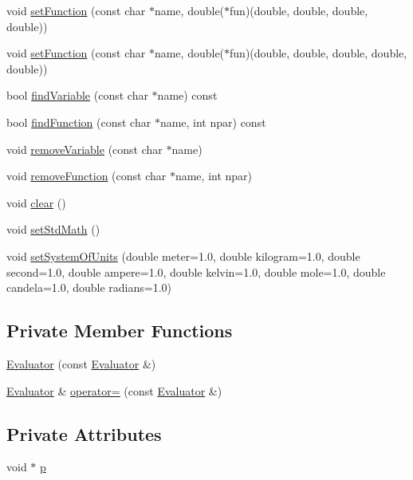 \begin{DoxyCompactItemize}
\item 
void \hyperlink{class_xml_tools_1_1_evaluator_a7e77831c7bca5fd7bb81d31b657844d1}{setFunction} (const char $\ast$name, double($\ast$fun)(double, double, double, double))
\item 
void \hyperlink{class_xml_tools_1_1_evaluator_ad4808f32cfac966a6ee400acaf7ff3ca}{setFunction} (const char $\ast$name, double($\ast$fun)(double, double, double, double, double))
\item 
bool \hyperlink{class_xml_tools_1_1_evaluator_afc296d1cfdcdb65b93e40b30cf2c2704}{findVariable} (const char $\ast$name) const 
\item 
bool \hyperlink{class_xml_tools_1_1_evaluator_ab2b36613d2c977346178abbd062ee354}{findFunction} (const char $\ast$name, int npar) const 
\item 
void \hyperlink{class_xml_tools_1_1_evaluator_a1fbc17d2bdbda88525e309098ba52563}{removeVariable} (const char $\ast$name)
\item 
void \hyperlink{class_xml_tools_1_1_evaluator_ac9c3b846be94d03ab2c06c68b4a86448}{removeFunction} (const char $\ast$name, int npar)
\item 
void \hyperlink{class_xml_tools_1_1_evaluator_ab54a35f068996b3c402c575f3aea242f}{clear} ()
\item 
void \hyperlink{class_xml_tools_1_1_evaluator_a5df1e3d20d6e6d9150378544d95e86b6}{setStdMath} ()
\item 
void \hyperlink{class_xml_tools_1_1_evaluator_a94fce6a14158fd1e9af0135268f0f68b}{setSystemOfUnits} (double meter=1.0, double kilogram=1.0, double second=1.0, double ampere=1.0, double kelvin=1.0, double mole=1.0, double candela=1.0, double radians=1.0)
\end{DoxyCompactItemize}
\subsection*{Private Member Functions}
\begin{DoxyCompactItemize}
\item 
\hyperlink{class_xml_tools_1_1_evaluator_a3b212d7fe6e68a9f398daebc2968ebfe}{Evaluator} (const \hyperlink{class_xml_tools_1_1_evaluator}{Evaluator} \&)
\item 
\hyperlink{class_xml_tools_1_1_evaluator}{Evaluator} \& \hyperlink{class_xml_tools_1_1_evaluator_a78e101bcb596a10ca44871fd3250b0ca}{operator=} (const \hyperlink{class_xml_tools_1_1_evaluator}{Evaluator} \&)
\end{DoxyCompactItemize}
\subsection*{Private Attributes}
\begin{DoxyCompactItemize}
\item 
void $\ast$ \hyperlink{class_xml_tools_1_1_evaluator_aa7c19df1b96202c09024f7b7f4942364}{p}
\end{DoxyCompactItemize}



